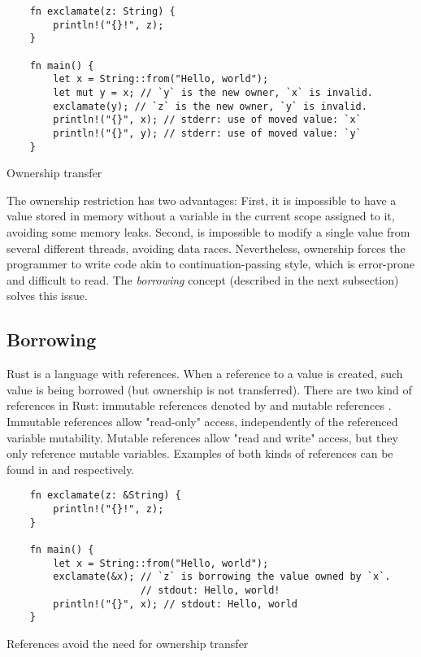 \begin{listing}[h]
	\begin{verbatim}
    fn exclamate(z: String) {
        println!("{}!", z);
    }

    fn main() {
        let x = String::from("Hello, world");
        let mut y = x; // `y` is the new owner, `x` is invalid.
        exclamate(y); // `z` is the new owner, `y` is invalid.
        println!("{}", x); // stderr: use of moved value: `x`
        println!("{}", y); // stderr: use of moved value: `y`
    }
	\end{verbatim}
  \caption{Ownership transfer}
  \label{lst:ownership}
\end{listing}

The ownership restriction has two advantages: First, it is impossible to have a
value stored in memory without a variable in the current scope assigned to it,
avoiding some memory leaks. Second, is impossible to modify a single value from
several different threads, avoiding data races. Nevertheless, ownership forces
the programmer to write code akin to continuation-passing style, which is
error-prone and difficult to read. The \textit{borrowing} concept (described in
the next subsection) solves this issue.

\subsection{Borrowing}

Rust is a language with references. When a reference to a value is created, such
value is being borrowed (but ownership is not transferred). There are two kind
of references in Rust: immutable references denoted by  and mutable
references . Immutable references allow "read-only" access,
independently of the referenced variable mutability. Mutable references allow
"read and write" access, but they only reference mutable variables. Examples of
both kinds of references can be found in  and
 respectively.

\begin{listing}[h]
	\begin{verbatim}
    fn exclamate(z: &String) {
        println!("{}!", z);
    }

    fn main() {
        let x = String::from("Hello, world");
        exclamate(&x); // `z` is borrowing the value owned by `x`.
                       // stdout: Hello, world! 
        println!("{}", x); // stdout: Hello, world
    }
	\end{verbatim}
  \caption{References avoid the need for ownership transfer}
  \label{lst:immutable_ref}
\end{listing}

